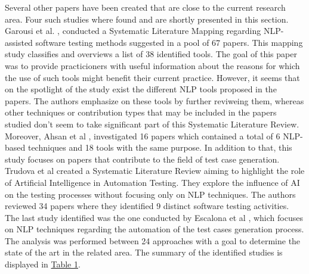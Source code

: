 Several other papers have been created that are close to the current research area. Four such studies where found \cite{garousi2020nlp,battina2019artificial,ahsan2017comprehensive,escalona2011overview} 
and are shortly presented in this section. Garousi et al. \cite{garousi2020nlp}, conducted a Systematic Literature Mapping regarding NLP-assisted software testing methods suggested in a pool 
of 67 papers. This mapping study classifies and overviews a list of 38 identified tools. The goal of this paper was to provide practicioners with useful information about the reasons for which 
the use of such tools might benefit their current practice. However, it seems that on the spotlight of the study exist the different NLP tools proposed in the papers. The authors emphasize on 
these tools by further reviweing them, whereas other techniques or contribution types that may be included in the papers studied don't seem to take significant part of this Systematic Literature 
Review. Moreover, Ahsan et al \cite{ahsan2017comprehensive}, investigated 16 papers which contained a total of 6 NLP-based techniques and 18 tools with the same purpose. In addition to that, this 
study focuses on papers that contribute to the field of test case generation.\\

Trudova et al \cite{battina2019artificial} created a Systematic Literature Review aiming to highlight the role of Artificial Intelligence in Automation Testing. 
They explore the influence of AI on the testing processes without focusing only on NLP techniques. The authors reviewed 34 papers where they identified 9 distinct software testing activities. 
The last study identified was the one conducted by Escalona et al \cite{escalona2011overview}, which focuses on NLP techniques regarding the automation of the test cases generation process. 
The analysis was performed between 24 approaches with a goal to determine the state of the art in the related area. The summary of the identified studies is displayed in \hyperref[table1]{Table 1}. \\

